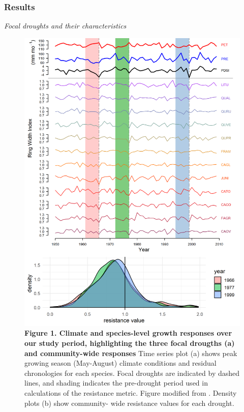 \documentclass[]{article}
\begin{document}
\hypertarget{results}{%
\subsubsection{Results}\label{results}}

\emph{Focal droughts and their characteristics}

\begin{figure}
\centering
\includegraphics[width=5.20833in,height=\textheight]{tables_figures/Figure1.png}
\caption{\textbf{Figure 1. Climate and species-level growth responses
over our study period, highlighting the three focal drougths (a) and
community-wide responses} Time series plot (a) shows peak growing season
(May-August) climate conditions and residual chronologies for each
species. Focal droughts are indicated by dashed lines, and shading
indicates the pre-drought period used in calculations of the resistance
metric. Figure modified from \citep{helcoski_growing_2019}. Density
plots (b) show community- wide resistance values for each drought.}
\end{figure}
\end{document}
